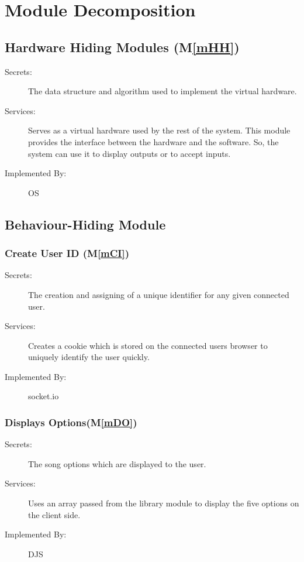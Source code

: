 \documentclass[12pt, titlepage]{article}
\newcommand{\mref}[1]{M\ref{#1}}
\begin{document}
\section{Module Decomposition} \label{SecMD}


\subsection{Hardware Hiding Modules (\mref{mHH})}


\begin{description}
\item[Secrets:]The data structure and algorithm used to implement the virtual
 hardware.
\item[Services:]Serves as a virtual hardware used by the rest of the
 system. This module provides the interface between the hardware and the
 software. So, the system can use it to display outputs or to accept inputs.
\item[Implemented By:] OS
\end{description}


\subsection{Behaviour-Hiding Module}


\subsubsection{Create User ID (\mref{mCI})}


\begin{description}
\item[Secrets:] The creation and assigning of a unique identifier for any given connected user.
\item[Services:]Creates a cookie which is stored on the connected users browser to uniquely identify the user quickly.
\item[Implemented By:] socket.io
\end{description}


\subsubsection{Displays Options(\mref{mDO})}


\begin{description}
\item[Secrets:]The song options which are displayed to the user.
\item[Services:]Uses an array passed from the library module to display the five options on the client side.
\item[Implemented By:] DJS
\end{description}
\end{document}
